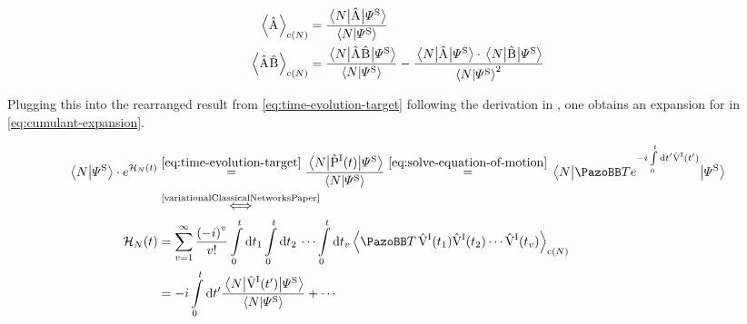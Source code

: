 \begin{equation}
    \label{eq:cumulant-expansion-coefficients}
    \begin{split}
        \left\langle\Aop\right\rangle_{\text{c}(N)} &= \frac{ \bracketHelper{N}{\Aop}{\picturePsi[\schroedingerPicture]{}}}{\braketHelper{N}{\picturePsi[\schroedingerPicture]{}}}\\
        \left\langle\Aop\Bop\right\rangle_{\text{c}(N)} &= \frac{\bracketHelper{N}{\Aop\Bop}{\picturePsi[\schroedingerPicture]{}}}{\braketHelper{N}{\picturePsi[\schroedingerPicture]{}}} -  \frac{\bracketHelper{N}{\Aop}{\picturePsi[\schroedingerPicture]{}} \cdot \bracketHelper{N}{\Bop}{\picturePsi[\schroedingerPicture]{}}}{\braketHelper{N}{\picturePsi[\schroedingerPicture]{}}^2}\\
    \end{split}
\end{equation}

Plugging this into the rearranged result from \autoref{eq:time-evolution-target} following the derivation in \cite{variationalClassicalNetworksPaper}, one obtains an expansion for \HNOft in \autoref{eq:cumulant-expansion}.

\begin{equation}
    \label{eq:cumulant-expansion}
    \begin{split}
        \braketHelper{N}{\picturePsi[\schroedingerPicture]{}} \cdot e^{\HNOft} &\stackrel{\ref{eq:time-evolution-target}}{=} \frac{\bracketHelper{N}{\timeEvolutionOperator[\interactionPicture]}{\picturePsi[\schroedingerPicture]{}}}{\braketHelper{N}{\picturePsi[\schroedingerPicture]{}}}
        \stackrel{\ref{eq:solve-equation-of-motion}}{=}
        \bracketHelper{N}{
            \timeOrderingOperator e^{-i\int\limits_0^t \text{d} t' \VhamiltonianOf[\interactionPicture]{t'}}
        }{\picturePsi[\schroedingerPicture]{}}\\
        &\stackrel{\text{\cite{variationalClassicalNetworksPaper}}}{\Longleftrightarrow}\\
        \HNOft &= \sum\limits_{v=1}^\infty \frac{\left(-i\right)^v}{v!} \int\limits_0^t\mathrm{d}t_1 \int\limits_0^t\mathrm{d}t_2 \,\,\dots \int\limits_0^t\mathrm{d}t_v \left\langle \timeOrderingOperator\, \VhamiltonianOf[\interactionPicture]{t_1}\VhamiltonianOf[\interactionPicture]{t_2} \cdots \VhamiltonianOf[\interactionPicture]{t_v} \right\rangle_{\text{c}(N)}\\
        &= -i \int\limits_0^t \mathrm{d}t' \frac{\bracketHelper{N}{\VhamiltonianOf[\interactionPicture]{t'}}{\picturePsi[\schroedingerPicture]{}}}{\braketHelper{N}{\picturePsi[\schroedingerPicture]{}}} + \cdots
    \end{split}
\end{equation}


